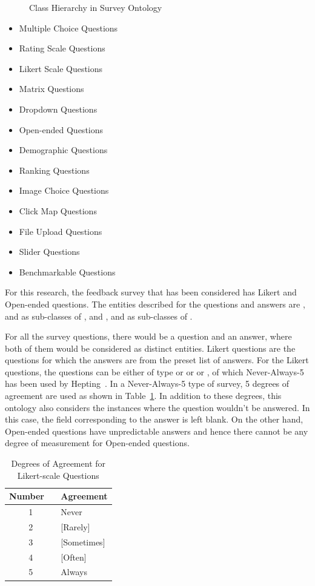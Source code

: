 \begin{doublespace}
\begin{figure}[htp]
    \caption{Class Hierarchy in Survey Ontology}
    \label{fig:4.8}
\end{figure}
\begin{multicols}{2}
\begin{itemize}
    \item Multiple Choice Questions
    \item Rating Scale Questions
    \item Likert Scale Questions
    \item Matrix Questions
    \item Dropdown Questions
    \item Open-ended Questions
    \item Demographic Questions
    \item Ranking Questions
    \item Image Choice Questions
    \item Click Map Questions
    \item File Upload Questions
    \item Slider Questions
    \item Benchmarkable Questions
\end{itemize}
\end{multicols}
\par For this research, the feedback survey that has been considered has Likert and Open-ended questions. The entities described for the questions and answers are , and  as sub-classes of , and , and  as sub-classes of .
\par For all the survey questions, there would be a question and an answer, where both of them would be considered as distinct entities. Likert questions are the questions for which the answers are from the preset list of answers. For the Likert questions, the questions can be either of type  or  or  or , of which Never-Always-5 has been used by Hepting~\cite{prof}. In a Never-Always-5 type of survey, 5 degrees of agreement are used as shown in Table~\ref{table:4.1}. In addition to these degrees, this ontology also considers the instances where the question wouldn't be answered. In this case, the field corresponding to the answer is left blank. On the other hand, Open-ended questions have unpredictable answers and hence there cannot be any degree of measurement for Open-ended questions.
\begin{table}[h!]
    \centering
    \begin{tabular}{|c|l|}
    \hline Number \ & Agreement \\ \hline
     1 & Never\\ \hline
     2 & [Rarely]\\ \hline
     3 & [Sometimes]\\ \hline
     4 & [Often]\\ \hline
     5 & Always\\ \hline
    \end{tabular}
    \caption{Degrees of Agreement for Likert-scale Questions}
    \label{table:4.1}
\end{table}

\end{doublespace}
